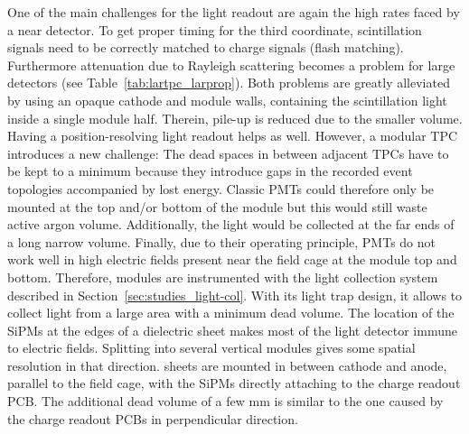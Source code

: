 One of the main challenges for the light readout are again the high rates faced by a near detector.
To get proper timing for the third coordinate, scintillation signals need to be correctly matched to charge signals (flash matching).
Furthermore attenuation due to Rayleigh scattering becomes a problem for large detectors (see Table~\ref{tab:lartpc_larprop}).
Both problems are greatly alleviated by using an opaque cathode and module walls, containing the scintillation light inside a single module half.
Therein, pile-up is reduced due to the smaller volume.
Having a position-resolving light readout helps as well.
However, a modular TPC introduces a new challenge: The dead spaces in between adjacent TPCs have to be kept to a minimum because they introduce gaps in the recorded event topologies accompanied by lost energy.
Classic PMTs could therefore only be mounted at the top and/or bottom of the module but this would still waste active argon volume.
Additionally, the light would be collected at the far ends of a long narrow volume.
Finally, due to their operating principle, PMTs do not work well in high electric fields present near the field cage at the module top and bottom.
Therefore, \AC{} modules are instrumented with the \AL{} light collection system described in Section~\ref{sec:studies_light-col}.
With its light trap design, it  allows to collect light from a large area with a minimum dead volume.
The location of the SiPMs at the edges of a dielectric sheet makes most of the light detector immune to electric fields.
Splitting \AL{} into several vertical modules gives some spatial resolution in that direction.
\AL{} sheets are mounted in between cathode and anode, parallel to the field cage, with the SiPMs directly attaching to the charge readout PCB.
The additional dead volume of a few \si{\milli\metre} is similar to the one caused by the charge readout PCBs in perpendicular direction.

\afterpage{\clearpage}